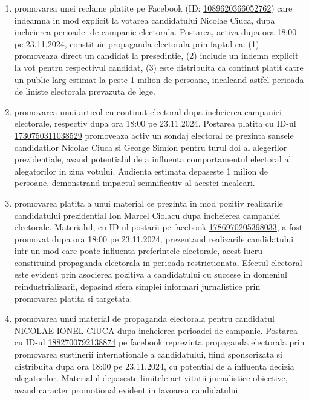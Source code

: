 \documentclass[a4paper,12pt]{article}
\begin{document}
\begin{enumerate}[leftmargin=*, label=\arabic*.)]
    \item promovarea unei reclame platite pe Facebook (ID: \href{https://www.facebook.com/ads/library/?id=1089620366052762}{1089620366052762}) care indeamna in mod explicit la votarea candidatului Nicolae Ciuca, dupa incheierea perioadei de campanie electorala. Postarea, activa dupa ora 18:00 pe 23.11.2024, constituie propaganda electorala prin faptul ca: (1) promoveaza direct un candidat la presedintie, (2) include un indemn explicit la vot pentru respectivul candidat, (3) este distribuita ca continut platit catre un public larg estimat la peste 1 milion de persoane, incalcand astfel perioada de liniste electorala prevazuta de lege.
    \item promovarea unui articol cu continut electoral dupa incheierea campaniei electorale, respectiv dupa ora 18:00 pe 23.11.2024. Postarea platita cu ID-ul \href{https://www.facebook.com/ads/library/?id=1730750311038529}{1730750311038529} promoveaza activ un sondaj electoral ce prezinta sansele candidatilor Nicolae Ciuca si George Simion pentru turul doi al alegerilor prezidentiale, avand potentialul de a influenta comportamentul electoral al alegatorilor in ziua votului. Audienta estimata depaseste 1 milion de persoane, demonstrand impactul semnificativ al acestei incalcari.
    \item promovarea platita a unui material ce prezinta in mod pozitiv realizarile candidatului prezidential Ion Marcel Ciolacu dupa incheierea campaniei electorale. Materialul, cu ID-ul postarii pe facebook \href{https://www.facebook.com/ads/library/?id=1786970205398033}{1786970205398033}, a fost promovat dupa ora 18:00 pe 23.11.2024, prezentand realizarile candidatului intr-un mod care poate influenta preferintele electorale, acest lucru constituind propaganda electorala in perioada restrictionata. Efectul electoral este evident prin asocierea pozitiva a candidatului cu succese in domeniul reindustrializarii, depasind sfera simplei informari jurnalistice prin promovarea platita si targetata.
    \item promovarea unui material de propaganda electorala pentru candidatul NICOLAE-IONEL CIUCA dupa incheierea perioadei de campanie. Postarea cu ID-ul \href{https://www.facebook.com/ads/library/?id=1882700792138874}{1882700792138874} pe facebook reprezinta propaganda electorala prin promovarea sustinerii internationale a candidatului, fiind sponsorizata si distribuita dupa ora 18:00 pe 23.11.2024, cu potential de a influenta decizia alegatorilor. Materialul depaseste limitele activitatii jurnalistice obiective, avand caracter promotional evident in favoarea candidatului.

\end{enumerate}
\end{document}
